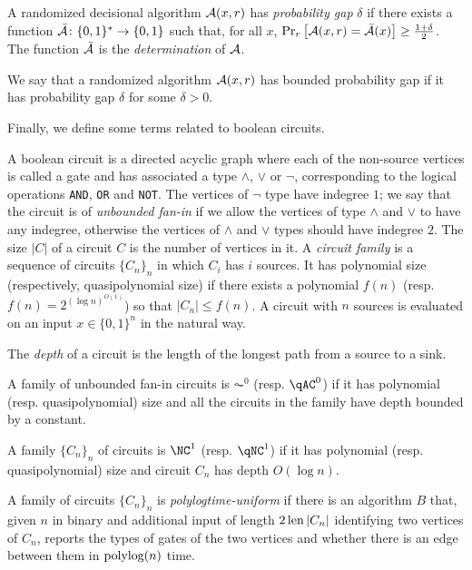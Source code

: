 \begin{definition}
A randomized decisional algorithm $\mathcal{A}(x, r)$ has \emph{probability gap} $\delta$ if there exists a function
$\bar{\mathcal{A}} \colon \{0, 1\}^* \to \{0, 1\}$ such that, for all $x$, 
$\text{Pr}_{r}\left[\mathcal{A}(x, r) = \bar{\mathcal{A}}(x)\right] \geq \frac{1 + \delta}{2}$. 
The function $\bar{\mathcal{A}}$ is the \emph{determination} of $\mathcal{A}$.

We say that a randomized algorithm $\mathcal{A}(x, r)$ has bounded probability gap if it has probability gap $\delta$
for some $\delta > 0$. 
\end{definition}

Finally, we define some terms related to boolean circuits. 

A boolean circuit is a directed acyclic graph where each of the non-source vertices is called a 
gate and has associated a type $\wedge$, $\vee$ or $\neg$, corresponding to the logical operations
\texttt{AND}, \texttt{OR} and \texttt{NOT}. The vertices of $\neg$ type have indegree $1$; we say
that the circuit is of \emph{unbounded fan-in} if we allow the vertices of type $\wedge$ and 
$\vee$ to have any indegree, otherwise the vertices of $\wedge$ and $\vee$ types should have
indegree $2$. The size $|C|$ of a circuit $C$ is the number of vertices in it.
A \emph{circuit family} is a sequence of circuits $\{C_n\}_{n}$ in which 
$C_i$ has $i$ sources. It has polynomial size (respectively, quasipolynomial size) if there exists
a polynomial $f(n)$ (resp. $f(n) = 2^{(\log n)^{O(1)}}$) so that $|C_n| \leq f(n)$.
A circuit with $n$ sources is evaluated on an input $x \in \{0, 1\}^n$ in the natural way. 

\begin{definition}
	The \emph{depth} of a circuit is the length of the longest path from a source to a sink.

	A family of unbounded fan-in circuits is $\AC^0$ (resp. $\qAC^0$) if it has polynomial
	(resp. quasipolynomial) size and all the circuits in the family
	have depth bounded by a constant. 

	A family $\{C_n\}_{n}$ of circuits is $\NC^1$  (resp. $\qNC^1$) if it has polynomial 
	(resp. quasipolynomial)
	size and circuit $C_n$
	has depth $O(\log n)$.
\end{definition}

\begin{definition}
	A family of circuits $\{C_n\}_{n}$ is \emph{polylogtime-uniform} if there is an 
	algorithm $B$ that, given $n$ in binary and additional input of length $2 \operatorname{len} |C_n|$ 
	identifying two vertices of $C_n$, reports the types of gates of the two vertices and whether
	there is an edge between them in $\text{polylog}(n)$ time.  
\end{definition}



